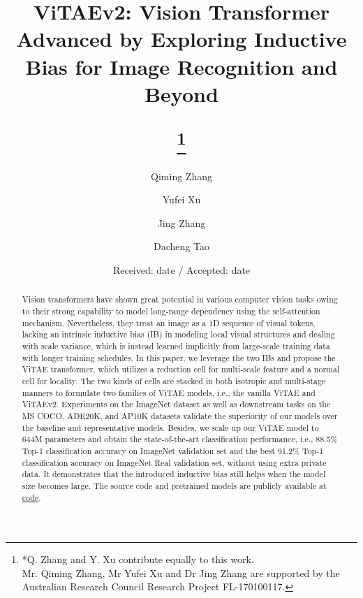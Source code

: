 \documentclass[twocolumn]{svjour3}          \smartqed  \usepackage{natbib}
\begin{document}
\title{ViTAEv2: Vision Transformer Advanced by Exploring Inductive Bias for Image Recognition and Beyond

\thanks{*Q. Zhang and Y. Xu  contribute equally to this work.\\Mr. Qiming Zhang, Mr Yufei Xu and Dr Jing Zhang are supported by the Australian Research Council Research Project FL-170100117.}
}

\author{Qiming Zhang         \and
        Yufei Xu \and
        Jing Zhang \and
        Dacheng Tao
}


\date{Received: date / Accepted: date}
\maketitle

\begin{abstract}
Vision transformers have shown great potential in various computer vision tasks owing to their strong capability to model long-range dependency using the self-attention mechanism. Nevertheless, they treat an image as a 1D sequence of visual tokens, lacking an intrinsic inductive bias (IB) in modeling local visual structures and dealing with scale variance, which is instead learned implicitly from large-scale training data with longer training schedules. In this paper, we leverage the two IBs and propose the ViTAE transformer, which utilizes a reduction cell for multi-scale feature and a normal cell for locality. The two kinds of cells are stacked in both isotropic and multi-stage manners to formulate two families of ViTAE models, i.e., the vanilla ViTAE and ViTAEv2. Experiments on the ImageNet dataset as well as downstream tasks on the MS COCO, ADE20K, and AP10K datasets validate the superiority of our models over the baseline and representative models. Besides, we scale up our ViTAE model to 644M parameters and obtain the state-of-the-art classification performance, i.e., 88.5\% Top-1 classification accuracy on ImageNet validation set and the best 91.2\% Top-1 classification accuracy on ImageNet Real validation set, without using extra private data. It demonstrates that the introduced inductive bias still helps when the model size becomes large. The source code and pretrained models are publicly available at \href{https://github.com/ViTAE-Transformer/ViTAE-Transformer}{code}.

\end{abstract}
\end{document}

